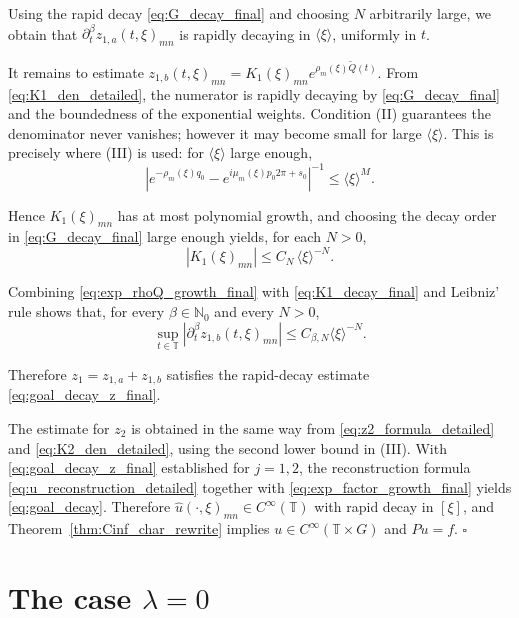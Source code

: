 \documentclass[11pt,reqno]{amsart}
\numberwithin{equation}{section}
\begin{document}
	Using the rapid decay \eqref{eq:G_decay_final} and choosing $N$ arbitrarily large, we obtain that
	$\partial_t^\beta z_{1,a}(t,\xi)_{mn}$ is rapidly decaying in $\langle\xi\rangle$, uniformly in $t$.
	
	It remains to estimate $z_{1,b}(t,\xi)_{mn}=K_1(\xi)_{mn}e^{\rho_m(\xi)\widetilde Q(t)}$.
	From \eqref{eq:K1_den_detailed}, the numerator is rapidly decaying by \eqref{eq:G_decay_final} and the boundedness
	of the exponential weights. Condition (II) guarantees the denominator never vanishes; however it may become small for
	large $\langle\xi\rangle$. This is precisely where (III) is used: for $\langle\xi\rangle$ large enough,
	\[
	\left|e^{-\rho_m(\xi)q_0}-e^{i\mu_m(\xi)p_0 2\pi+s_0}\right|^{-1}\le \langle\xi\rangle^{M}.
	\]
	
	Hence $K_1(\xi)_{mn}$ has at most polynomial growth, and choosing the decay order in \eqref{eq:G_decay_final} large
	enough yields, for each $N>0$,
	\begin{equation}\label{eq:K1_decay_final}
		|K_1(\xi)_{mn}|\le C_N\,\langle\xi\rangle^{-N}.
	\end{equation}
	
	Combining \eqref{eq:exp_rhoQ_growth_final} with \eqref{eq:K1_decay_final} and Leibniz' rule shows that, for every
	$\beta\in\mathbb{N}_0$ and every $N>0$,
	\[
	\sup_{t\in\mathbb{T}}|\partial_t^\beta z_{1,b}(t,\xi)_{mn}|
	\le C_{\beta,N}\langle\xi\rangle^{-N}.
	\]
	
	Therefore $z_1=z_{1,a}+z_{1,b}$ satisfies the rapid-decay estimate \eqref{eq:goal_decay_z_final}.
	
	The estimate for $z_2$ is obtained in the same way from \eqref{eq:z2_formula_detailed} and \eqref{eq:K2_den_detailed},
	using the second lower bound in (III). With \eqref{eq:goal_decay_z_final} established for $j=1,2$, the reconstruction
	formula \eqref{eq:u_reconstruction_detailed} together with \eqref{eq:exp_factor_growth_final} yields \eqref{eq:goal_decay}.
	Therefore $\widehat u(\cdot,\xi)_{mn}\in C^\infty(\mathbb{T})$ with rapid decay in $[\xi]$, and
	Theorem~\ref{thm:Cinf_char_rewrite} implies $u\in C^\infty(\mathbb{T}\times G)$ and $Pu=f$. \hfill $\square$
	
	
	\section{The case $\lambda=0$}\label{sec:lambda0}
	
\end{document}

